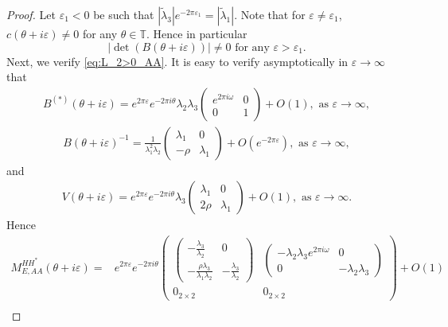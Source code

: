 \documentclass[11pt]{amsart}
\newcommand{\T}{\mathbb T}
\begin{document}
\begin{proof}
Let $\varepsilon_1<0$ be such that $|\tilde{\lambda}_3|e^{-2\pi\varepsilon_1}=|\tilde{\lambda}_1|$.
Note that for $\varepsilon\neq \varepsilon_1$, $c(\theta+i\varepsilon)\neq 0$ for any $\theta\in \T$. Hence in particular 
\[|\det (B(\theta+i\varepsilon))|\neq 0 \text{ for any } \varepsilon>\varepsilon_1.\]
Next, we verify \eqref{eq:L_2>0_AA}.
It is easy to verify asymptotically in $\varepsilon\to\infty$ that
\begin{align}
B^{(*)}(\theta+i\varepsilon)=e^{2\pi \varepsilon}e^{-2\pi i\theta}\lambda_2\lambda_3\left(\begin{matrix} e^{2\pi i\omega}& 0\\
0 &1\end{matrix}\right)+O(1), \text{ as } \varepsilon\to\infty,
\end{align}
\begin{align}
    B(\theta+i\varepsilon)^{-1}=\frac{1}{\lambda_1^2\lambda_2}\left(\begin{matrix} 
    \lambda_1 &0\\ 
    -\rho &\lambda_1 \end{matrix}\right)+O(e^{-2\pi\varepsilon}), \text{ as } \varepsilon\to\infty,
\end{align}
and
\begin{align}
    V(\theta+i\varepsilon)=e^{2\pi\varepsilon}e^{-2\pi i\theta}\lambda_3\left(\begin{matrix}
        \lambda_1 &0\\
        2\rho &\lambda_1 
    \end{matrix}\right)+O(1), \text{ as } \varepsilon\to\infty.
\end{align}
Hence
\begin{align}
M_{E,AA}^{HH^*}(\theta+i\varepsilon)
=&e^{2\pi\varepsilon}e^{-2\pi i\theta}
\left(\begin{array}{c|c}
    \left(\begin{matrix}-\frac{\lambda_3}{\lambda_2} &0\\
    -\frac{\rho \lambda_3}{\lambda_1\lambda_2} &-\frac{\lambda_3}{\lambda_2}\end{matrix}\right)
    &\left(\begin{matrix}
        -\lambda_2\lambda_3 e^{2\pi i\omega} &0\\
        0 &-\lambda_2\lambda_3
    \end{matrix}\right)\\
    \hline
    0_{2\times 2} &0_{2\times 2}
\end{array}\right)+O(1)\\

\end{align}
\end{proof}
\end{document}
